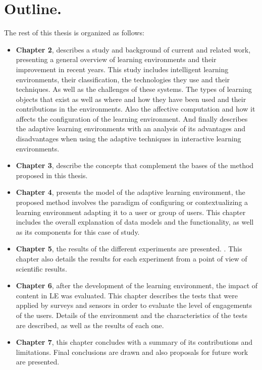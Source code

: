 \section{Outline.}
The rest of this thesis is organized as follows:
\begin{itemize}	
\item \textbf{Chapter 2}, 
describes a study and background of current and related work, presenting a general overview of learning environments and their improvement in recent years. This study includes intelligent learning environments, their classification, the technologies they use and their techniques. As well as the
challenges of these systems. The types of learning objects that exist as well as where and how they have been used and their contributions in the environments. Also the affective computation and how it affects the configuration of the learning environment. And finally describes the adaptive learning environments with an analysis of its advantages and disadvantages when using the adaptive techniques in interactive learning environments.

\item \textbf{Chapter 3}, 
describe the concepts that complement the bases of the method proposed in this thesis.

\item \textbf{Chapter 4}, presents the model of the adaptive learning environment, the proposed method involves the paradigm of configuring or contextualizing a learning environment adapting it to a user or group of users.
This chapter includes the overall explanation of data models and the functionality, as well as its components for this case of study.

\item \textbf{Chapter 5}, the results of the different experiments are presented. . This chapter also details the results
for each experiment from a point of view of scientiﬁc results.
\item \textbf{Chapter 6}, after the development of the learning environment, the impact of content in LE was evaluated. This chapter
describes the tests that were applied by surveys and sensors in order to evaluate the level of engagements of the users. Details of the environment and the characteristics of the
tests are described, as well as the results of each one. 
\item \textbf{Chapter 7}, this chapter concludes with a summary of its contributions and limitations. Final conclusions are drawn and also proposals for future work
are presented.

\end{itemize}
